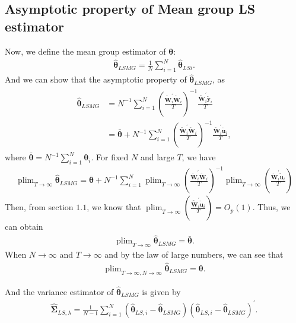 \documentclass[12pt,a4paper,hyperref]{article}
\DeclareMathOperator*{\plim}{plim}
\begin{document}
\subsection{Asymptotic property of Mean group LS estimator }
Now, we define the mean group estimator of $\boldsymbol{\theta}$:
\begin{align}
\hat{\boldsymbol{\theta}}_{LSMG}=\frac{1}{N}\sum^{N}_{i=1}\hat{\boldsymbol{\theta}}_{LSi}.
\end{align}
And we can show that the asymptotic property of $\hat{\boldsymbol{\theta}}_{LSMG}$, as
\begin{align}
\begin{split}
\hat{\boldsymbol{\theta}}_{LSMG}&=N^{-1}\sum^{N}_{i=1}\left(\frac{\tilde{\boldsymbol{W}}^{'}_{i} \tilde{\boldsymbol{W}}_{i}}{T}  \right)^{-1} \frac{ \tilde{\boldsymbol{W}}^{'}_{i}\tilde{\boldsymbol{y}}_{i}}{T} \\
&=\bar{\boldsymbol{\theta}}+N^{-1}\sum^{N}_{i=1}\left(\frac{\tilde{\boldsymbol{W}}^{'}_{i} \tilde{\boldsymbol{W}}_{i}}{T}  \right)^{-1} \frac{ \tilde{\boldsymbol{W}}^{'}_{i}\tilde{\boldsymbol{u}}_{i}}{T},
\end{split}
\end{align}
where $\bar{\boldsymbol{\theta}}=N^{-1}\sum^{N}_{i=1}\boldsymbol{\theta}_{i}.$
For fixed $N$ and large $T$, we have
\begin{align}
\plim_{T \to \infty}\hat{\boldsymbol{\theta}}_{LSMG} =  \bar{\boldsymbol{\theta}}+ N^{-1}\sum^{N}_{i=1}\plim_{T \to \infty}\left(\frac{\tilde{\boldsymbol{W}}^{'}_{i} \tilde{\boldsymbol{W}}_{i}}{T}  \right)^{-1}\plim_{T \to \infty}\left( \frac{ \tilde{\boldsymbol{W}}^{'}_{i}\tilde{\boldsymbol{u}}_{i}}{T}\right)
\end{align}
 Then, from section $1.1$, we know that $\plim_{T \to \infty}\left( \frac{ \tilde{\boldsymbol{W}}^{'}_{i}\tilde{\boldsymbol{u}}_{i}}{T}\right)=O_{p}(1)$. Thus,  we can obtain
\begin{align}
\plim_{T \to \infty}\hat{\boldsymbol{\theta}}_{LSMG} =  \bar{\boldsymbol{\theta}}.
\end{align}
When $N \to \infty$ and $T \to \infty$ and by the law of large numbers, we can see that
\begin{align}
\plim_{T \to \infty, N \to \infty}\hat{\boldsymbol{\theta}}_{LSMG}=\boldsymbol{\theta}.
\end{align}







And the variance estimator of $\hat{\boldsymbol{\theta}}_{LSMG}$ is given by
\begin{align}
\hat{\boldsymbol{\Sigma}}_{LS,\lambda}=\frac{1}{N-1}\sum^{N}_{i=1}\left( \hat{\boldsymbol{\theta}}_{LS,i}- \hat{\boldsymbol{\theta}}_{LSMG}\right)\left( \hat{\boldsymbol{\theta}}_{LS,i}- \hat{\boldsymbol{\theta}}_{LSMG}\right)^{'}. \label{V1}
\end{align}
\end{document}
